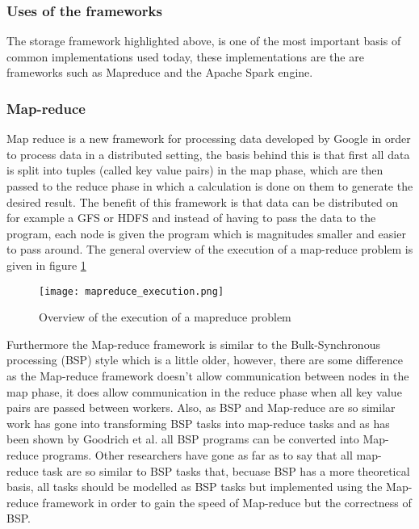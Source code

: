 \subsubsection{Uses of the frameworks}
The storage framework highlighted above, is one of the most important basis of common implementations used today,
these implementations are the are frameworks such as Mapreduce and the Apache Spark engine.

\subsubsection{Map-reduce}
Map reduce is a new framework for processing data developed by Google\cite{Dean04} in order
to process data in a distributed setting, the basis behind this is that first all
data is split into tuples (called key value pairs) in the map phase, which are then passed to the reduce
phase in which a calculation is done on them to generate the desired result. The
benefit of this framework is that data can be distributed on for example a GFS or HDFS
and instead of having to pass the data to the program, each node is given the program
which is magnitudes smaller and easier to pass around. The general overview of
the execution of a map-reduce problem is given in figure \ref{mapreduce_execution}

\begin{figure}
  \texttt{[image: mapreduce\_execution.png]}
  \caption{Overview of the execution of a mapreduce problem\cite{Dean04}}
  \label{mapreduce_execution}
\end{figure}

Furthermore the Map-reduce framework is similar to the Bulk-Synchronous processing (BSP)
style which is a little older, however, there are some difference as the Map-reduce
framework doesn't allow communication between nodes in the map phase, it does allow
communication in the reduce phase when all key value pairs are passed between workers\cite{Pace12}.
Also, as BSP and Map-reduce are so similar work has gone into transforming BSP tasks into
map-reduce tasks and as has been shown by Goodrich et al.\cite{Goo11} all BSP programs can be
converted into Map-reduce programs. Other researchers have gone as far as to say
that all map-reduce task are so similar to BSP tasks that, becuase BSP has a more theoretical
basis, all tasks should be modelled as BSP tasks but implemented using the Map-reduce framework
in order to gain the speed of Map-reduce but the correctness of BSP\cite{Pace12}.

